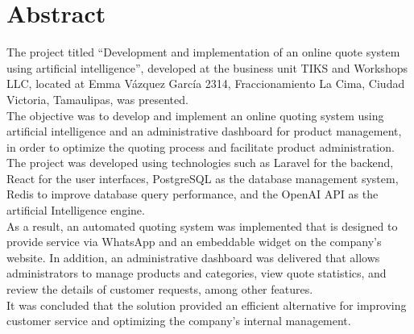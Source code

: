 \documentclass[12pt]{article}
\begin{document}



\clearpage
\thispagestyle{fancy}
\section*{Abstract}

The project titled “Development and implementation of an online quote system using artificial intelligence”, developed at the business unit TIKS and Workshops LLC, located at Emma Vázquez García 2314, Fraccionamiento La Cima, Ciudad Victoria, Tamaulipas, was presented.\\
The objective was to develop and implement an online quoting system using artificial intelligence and an administrative dashboard for product management, in order to optimize the quoting process and facilitate product administration.\\
The project was developed using technologies such as Laravel for the backend, React for the user interfaces, PostgreSQL as the database management system, Redis to improve database query performance, and the OpenAI API as the artificial Intelligence engine.\\
As a result, an automated quoting system was implemented that is designed to provide service via WhatsApp and an embeddable widget on the company’s website. In addition, an administrative dashboard was delivered that allows administrators to manage products and categories, view quote statistics, and review the details of customer requests, among other features.\\
It was concluded that the solution provided an efficient alternative for improving customer service and optimizing the company’s internal management.
\end{document}
